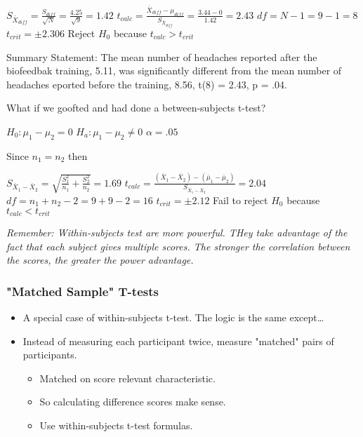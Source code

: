 \documentclass[11pt]{report}
\begin{document}
{    $S_{\bar{X}_{diff}} = \frac{S_{diff}}{\sqrt{N}} = \frac{4.25}{\sqrt{9}} = 1.42$ \newline
    $t_{calc} = \frac{\bar{X}_{diff} - \mu_{diff}}{S_{\bar{X}_{diff}}} = \frac{3.44 - 0}{1.42} = 2.43$ \newline
    $df = N - 1 = 9 - 1 = 8$ \newline
    $t_{crit} = \pm 2.306$ \newline
    Reject $H_0$ because $t_{calc} > t_{crit}$ \newline

    Summary Statement: \newline
    The mean number of headaches reported after the biofeedbak training, 5.11, was significantly different from the mean number of headaches eported before the training, 8.56, t(8) = 2.43, p = .04. 
}

{
    What if we goofted and had done a between-subjects t-test? \newline 

    $H_0: \mu_1 - \mu_{2} = 0$ \newline
    $H_a: \mu_1 - \mu_{2} \neq 0$ \newline
    $\alpha = .05$ \newline

    Since $n_1 = n_2$ then \newline 

    $S_{\bar{X}_{1} - \bar{X}_{2}} = \sqrt{\frac{S_{1}^2}{n_1} + \frac{S_{2}^2}{n_2}} = 1.69$ \newline
    $t_{calc} = \frac{(\bar{X}_{1} - \bar{X}_{2}) - (\bar{\mu}_1 - \bar{\mu}_2)}{S_{\bar{X}_{1} - \bar{X}_{2}}} = 2.04$ \newline
    $df = n_1 + n_2 - 2 = 9 + 9 - 2 = 16$ \newline
    $t_{crit} = \pm 2.12$ \newline
    Fail to reject $H_0$ because $t_{calc} < t_{crit}$ \newline
}

\textit{Remember: Within-subjects test are more powerful. THey take advantage of the fact that each subject gives multiple scores. The stronger the correlation between the scores, the greater the power advantage.}

\subsubsection{"Matched Sample" T-tests}
\begin{itemize}
    \item A special case of within-subjects t-test. The logic is the same except\dots
    \item Instead of measuring each participant twice, measure "matched" pairs of participants.
    \begin{itemize}
        \item Matched on score relevant characteristic.
        \item So calculating difference scores make sense.
        \item Use within-subjects t-test formulas.
    \end{itemize}
\end{itemize}
\end{document}
